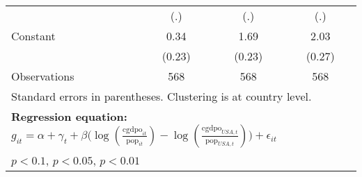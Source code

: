 \begin{table}[htbp]
\begin{tabular}{l*{3}{c}}
                &      (.)         &      (.)         &      (.)         \\
\addlinespace
Constant        &     0.34         &     1.69\sym{***}&     2.03\sym{***}\\
                &   (0.23)         &   (0.23)         &   (0.27)         \\
\midrule
Observations    &      568         &      568         &      568         \\
\bottomrule
\multicolumn{4}{l}{\footnotesize Standard errors in parentheses. Clustering is at country level.}\\
\multicolumn{4}{l}{\footnotesize \textbf{Regression equation:} \(g_{it} = \alpha + \gamma_t + \beta \big(\log (\frac{\textrm{cgdpo}_{it}}{\textrm{pop}_{it}} ) - \log (\frac{\textrm{cgdpo}_{USA,t}}{\textrm{pop}_{USA,t}}  ) \big) + \epsilon_{it}\)}\\
\multicolumn{4}{l}{\footnotesize \sym{*} \(p<0.1\), \sym{**} \(p<0.05\), \sym{***} \(p<0.01\)}\\
\end{tabular}
\end{table}
